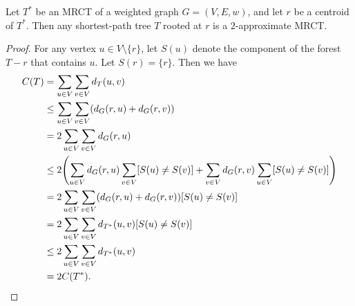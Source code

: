 \documentclass[11pt]{article}
\begin{document}
\begin{theorem}
  Let $T^*$ be an MRCT of a weighted graph $G = (V, E, w)$, and let $r$ be a centroid of $T^*$.
  Then any shortest-path tree $T$ rooted at $r$ is a $2$-approximate MRCT.
\end{theorem}
\begin{proof}
  For any vertex $u \in V \setminus \{r\}$, let $S(u)$ denote the component of the forest $T - r$ that contains $u$.
  Let $S(r) = \{r\}$.
  Then we have
  \begin{align*}
    C(T)
    &= \sum_{u \in V} \sum_{v \in V} d_T(u, v) \\
    &\leq \sum_{u \in V} \sum_{v \in V} (d_G(r, u) + d_G(r, v)) \\
    &= 2 \sum_{u \in V} \sum_{v \in V} d_G(r, u) \\
    &\leq 2 \Biggl( \sum_{u \in V} d_G(r, u) \sum_{v \in V} [S(u) \neq S(v)] + \sum_{v \in V} d_G(r, v) \sum_{u \in V} [S(u) \neq S(v)] \Biggr) \\
    &= 2 \sum_{u \in V} \sum_{v \in V} (d_G(r, u) + d_G(r, v)) [S(u) \neq S(v)] \\
    &= 2 \sum_{u \in V} \sum_{v \in V} d_{T^*}(u, v) [S(u) \neq S(v)] \\
    &\leq 2 \sum_{u \in V} \sum_{v \in V} d_{T^*}(u, v) \\
    &= 2C(T^*).
    \qedhere
  \end{align*}
\end{proof}
\end{document}
